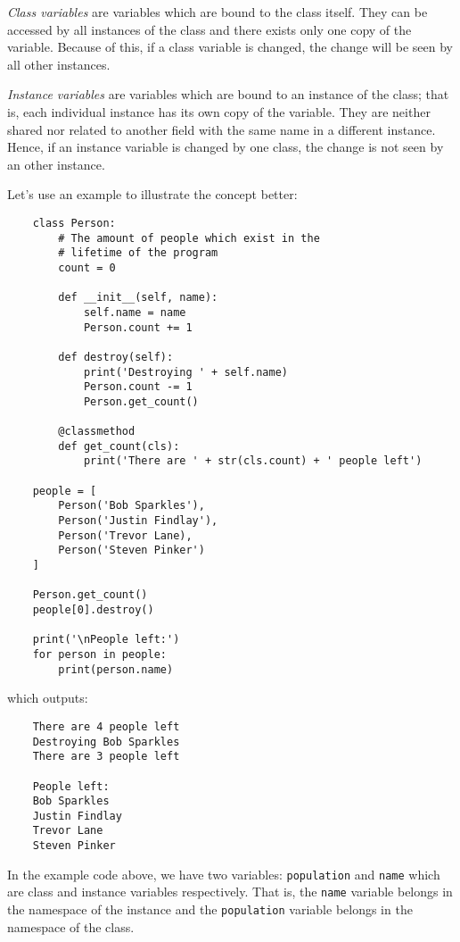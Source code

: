 \documentclass{cslesson}
\begin{document}
\textit{Class variables} are variables which are bound to the class itself. They can be accessed by all
instances of the class and there exists only one copy of the variable. Because of this, if a class variable
is changed, the change will be seen by all other instances.

\textit{Instance variables} are variables which are bound to an instance of the class; that is, each individual
instance has its own copy of the variable. They are neither shared nor related to another field with the same name
in a different instance. Hence, if an instance variable is changed by one class, the change is not seen by an other instance.

Let's use an example to illustrate the concept better:
\newpage
\begin{verbatim}
    class Person:
        # The amount of people which exist in the
        # lifetime of the program
        count = 0
        
        def __init__(self, name):
            self.name = name
            Person.count += 1
        
        def destroy(self):
            print('Destroying ' + self.name)
            Person.count -= 1
            Person.get_count()

        @classmethod
        def get_count(cls):
            print('There are ' + str(cls.count) + ' people left')

    people = [
        Person('Bob Sparkles'),
        Person('Justin Findlay'),
        Person('Trevor Lane),
        Person('Steven Pinker')
    ]

    Person.get_count()
    people[0].destroy()

    print('\nPeople left:')
    for person in people:
        print(person.name)
\end{verbatim}
which outputs:
\begin{verbatim}
    There are 4 people left
    Destroying Bob Sparkles
    There are 3 people left

    People left:
    Bob Sparkles
    Justin Findlay
    Trevor Lane
    Steven Pinker
\end{verbatim}

In the example code above, we have two variables: \texttt{population} and \texttt{name} which are class and instance
variables respectively. That is, the \texttt{name} variable belongs in the namespace of the instance and the \texttt{population}
variable belongs in the namespace of the class.
\end{document}
